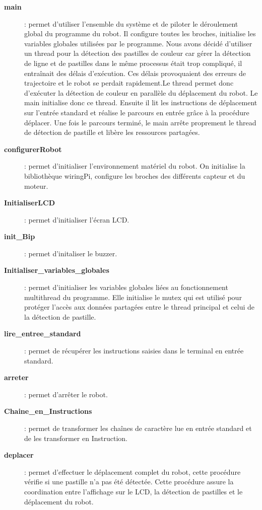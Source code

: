 \begin{description}

\item[\textbf{main}] : permet d'utiliser l'ensemble du système et de piloter le déroulement global du programme du robot. Il configure toutes les broches, initialise les variables globales utilisées par le programme. Nous avons décidé d'utiliser un thread pour la détection des pastilles de couleur car gérer la détection de ligne et de pastilles dans le même processus était trop compliqué, il entraînait des délais d'exécution. Ces délais provoquaient des erreurs de trajectoire et le robot se perdait rapidement.Le thread permet donc d'exécuter la détection de couleur en parallèle du déplacement du robot. Le main initialise donc ce thread. Ensuite il lit les instructions de déplacement sur l'entrée standard et réalise le parcours en entrée grâce à la procédure déplacer. Une fois le parcours terminé, le main arrête proprement le thread de détection de pastille et libère les ressources partagées.

\item[\textbf{configurerRobot}] : permet d'initialiser l'environnement matériel du robot. On initialise la bibliothèque wiringPi, configure les broches des différents capteur et du moteur.

\item[\textbf{InitialiserLCD}]: permet d'initialiser l'écran LCD.

\item[\textbf{init\_Bip}]: permet d'initaliser le buzzer.

\item[\textbf{Initialiser\_variables\_globales}]: permet d'initialiser les variables globales liées au fonctionnement multithread du programme. Elle initialise le mutex qui est utilisé pour protéger l'accès aux données partagées entre le thread principal et celui de la détection de pastille.

\item[\textbf{lire\_entree\_standard}] : permet de récupérer les instructions saisies dans le terminal en entrée standard.

\item[\textbf{arreter}]: permet d'arrêter le robot.

\item[\textbf{Chaine\_en\_Instructions}]: permet de transformer les chaînes de caractère lue en entrée standard et de les transformer en Instruction.

\item[\textbf{deplacer}]: permet d'effectuer le déplacement complet du robot, cette procédure vérifie si une pastille n'a pas été détectée. Cette procédure assure la coordination entre l'affichage sur le LCD, la détection de pastilles et le déplacement du robot.


\end{description}
